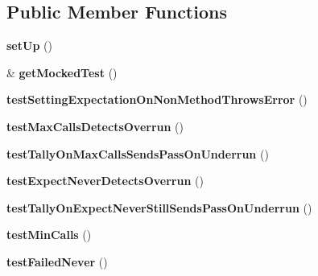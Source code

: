 \subsection*{Public Member Functions}
\begin{DoxyCompactItemize}
\item 
\hypertarget{class_test_of_mock_expectations_a2484f0cde229a961dcdb0c8ef454f5c9}{
{\bfseries setUp} ()}
\label{class_test_of_mock_expectations_a2484f0cde229a961dcdb0c8ef454f5c9}

\item 
\hypertarget{class_test_of_mock_expectations_a8fe76bfe24ef9e4244fc01e5b35bf5fc}{
\& {\bfseries getMockedTest} ()}
\label{class_test_of_mock_expectations_a8fe76bfe24ef9e4244fc01e5b35bf5fc}

\item 
\hypertarget{class_test_of_mock_expectations_a87747e109af4119a0ef777a8a6a5cc01}{
{\bfseries testSettingExpectationOnNonMethodThrowsError} ()}
\label{class_test_of_mock_expectations_a87747e109af4119a0ef777a8a6a5cc01}

\item 
\hypertarget{class_test_of_mock_expectations_a23fac0ae56a15447bb62627bf57b7bc0}{
{\bfseries testMaxCallsDetectsOverrun} ()}
\label{class_test_of_mock_expectations_a23fac0ae56a15447bb62627bf57b7bc0}

\item 
\hypertarget{class_test_of_mock_expectations_a4a89e9a8adc7de6a5b7f94bfe5ae38c8}{
{\bfseries testTallyOnMaxCallsSendsPassOnUnderrun} ()}
\label{class_test_of_mock_expectations_a4a89e9a8adc7de6a5b7f94bfe5ae38c8}

\item 
\hypertarget{class_test_of_mock_expectations_af3b594ad5a888c3f443726e7d71f75e5}{
{\bfseries testExpectNeverDetectsOverrun} ()}
\label{class_test_of_mock_expectations_af3b594ad5a888c3f443726e7d71f75e5}

\item 
\hypertarget{class_test_of_mock_expectations_a9df7daa2c4ef38e71d92c40725b3f136}{
{\bfseries testTallyOnExpectNeverStillSendsPassOnUnderrun} ()}
\label{class_test_of_mock_expectations_a9df7daa2c4ef38e71d92c40725b3f136}

\item 
\hypertarget{class_test_of_mock_expectations_a4673354b34b1f80daa1edf96dd9f2b4c}{
{\bfseries testMinCalls} ()}
\label{class_test_of_mock_expectations_a4673354b34b1f80daa1edf96dd9f2b4c}

\item 
\hypertarget{class_test_of_mock_expectations_a0f635575d6ba47589cb17ceeccc896c2}{
{\bfseries testFailedNever} ()}
\label{class_test_of_mock_expectations_a0f635575d6ba47589cb17ceeccc896c2}


\end{DoxyCompactItemize}
